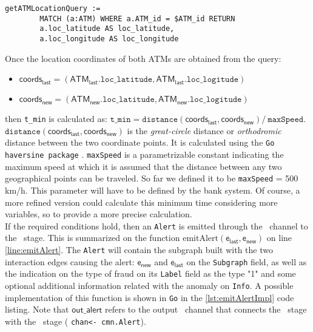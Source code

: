 \begin{itemize}
    
    \begin{center}
    \lstset{style=cypherStyle}
    \begin{lstlisting}[caption={Code of the constructed \texttt{Cypher} query in \texttt{Go} to obtain the location coordinates of an ATM with its id on the Neo4j graph database}, label={lst:cypherQueryCoords}]
        getATMLocationQuery := 
        MATCH (a:ATM) WHERE a.ATM_id = $ATM_id RETURN 
        a.loc_latitude AS loc_latitude, 
        a.loc_longitude AS loc_longitude
    \end{lstlisting}
    \end{center}

    Once the location coordinates of both ATMs are obtained from the query:
    \begin{itemize}
        \item  $\mathsf{coords_{last}} = (\mathsf{ATM_{last}}.\texttt{loc\_latitude}, \mathsf{ATM_{last}}.\texttt{loc\_logitude})$ 
        \item  $\mathsf{coords_{new}} = (\mathsf{ATM_{new}}.\texttt{loc\_latitude}, \mathsf{ATM_{new}}.\texttt{loc\_logitude})$
    \end{itemize}
    
    then \texttt{t\_min} is calculated as: $\texttt{t\_min} = \texttt{distance}(\mathsf{coords_{last}}, \mathsf{coords_{new}})/\ \texttt{maxSpeed}$.\\
    $\texttt{distance}(\mathsf{coords_{last}}, \mathsf{coords_{new}})$ is the \textit{great-circle} distance or \textit{orthodromic} distance between the two coordinate points. It is calculated using the \texttt{Go} \texttt{haversine package} \cite{go-haversine}. \texttt{maxSpeed} is a parametrizable constant indicating the maximum speed at which it is assumed that the distance between any two geographical points can be traveled. So far we defined it to be \texttt{maxSpeed} = 500 km/h. This parameter will have to be defined by the bank system. Of course, a more refined version could calculate this minimum time considering more variables, so to provide a more precise calculation.\\

    If the required conditions hold, then an \texttt{Alert} is emitted through the \alertch\ channel to the \sink\ stage. This is summarized on the function $\text{emitAlert}(\mathsf{e_{last}}, \mathsf{e_{new}})$ on line \ref{line:emitAlert}. The \texttt{Alert} will contain the subgraph built with the two interaction edges causing the alert: $\mathsf{e_{new}}$ and $\mathsf{e_{last}}$ on the \texttt{Subgraph} field, as well as the indication on the type of fraud on its \texttt{Label} field as the type "1" and some optional additional information related with the anomaly on \texttt{Info}. A possible implementation of this function is shown in \texttt{Go} in the \ref{lst:emitAlertImpl} code listing. Note that $\mathsf{out\_alert}$ refers to the output \alertch\ channel that connects the \filter\ stage with the \sink\ stage ( \texttt{chan<- cmn.Alert}).


\end{itemize}
